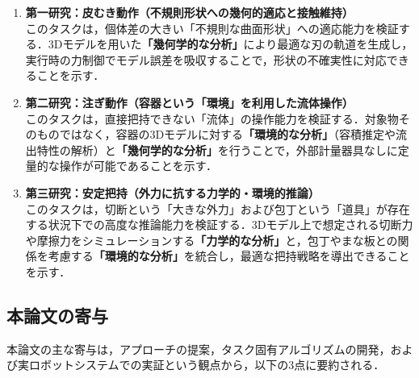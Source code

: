 \begin{enumerate}
    \item \textbf{第一研究：皮むき動作（不規則形状への幾何的適応と接触維持）} \\
    このタスクは，個体差の大きい「不規則な曲面形状」への適応能力を検証する．3Dモデルを用いた\textbf{「幾何学的な分析」}により最適な刃の軌道を生成し，実行時の力制御でモデル誤差を吸収することで，形状の不確実性に対応できることを示す．
    
    \item \textbf{第二研究：注ぎ動作（容器という「環境」を利用した流体操作）} \\
    このタスクは，直接把持できない「流体」の操作能力を検証する．対象物そのものではなく，容器の3Dモデルに対する\textbf{「環境的な分析」}（容積推定や流出特性の解析）と\textbf{「幾何学的な分析」}を行うことで，外部計量器具なしに定量的な操作が可能であることを示す．
    
    \item \textbf{第三研究：安定把持（外力に抗する力学的・環境的推論）} \\
    このタスクは，切断という「大きな外力」および包丁という「道具」が存在する状況下での高度な推論能力を検証する．3Dモデル上で想定される切断力や摩擦力をシミュレーションする\textbf{「力学的な分析」}と，包丁やまな板との関係を考慮する\textbf{「環境的な分析」}を統合し，最適な把持戦略を導出できることを示す．
\end{enumerate}

\subsection{本論文の寄与}

本論文の主な寄与は，アプローチの提案，タスク固有アルゴリズムの開発，および実ロボットシステムでの実証という観点から，以下の3点に要約される．

